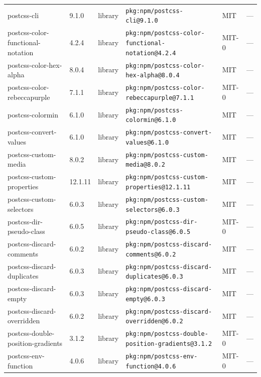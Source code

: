 \documentclass[11pt,a4paper]{article}
\begin{document}
\begin{longtable}{|p{4cm}|p{2cm}|p{1.6cm}|p{5cm}|p{1.5cm}|p{3.5cm}|}
\raggedright postcss-cli & 9.1.0 & library & \small\texttt{pkg:npm/postcss-cli@9.1.0} & MIT & \small — \\
\raggedright postcss-color-functional-notation & 4.2.4 & library & \small\texttt{pkg:npm/postcss-color-functional-notation@4.2.4} & MIT-0 & \small — \\
\raggedright postcss-color-hex-alpha & 8.0.4 & library & \small\texttt{pkg:npm/postcss-color-hex-alpha@8.0.4} & MIT & \small — \\
\raggedright postcss-color-rebeccapurple & 7.1.1 & library & \small\texttt{pkg:npm/postcss-color-rebeccapurple@7.1.1} & MIT-0 & \small — \\
\raggedright postcss-colormin & 6.1.0 & library & \small\texttt{pkg:npm/postcss-colormin@6.1.0} & MIT & \small — \\
\raggedright postcss-convert-values & 6.1.0 & library & \small\texttt{pkg:npm/postcss-convert-values@6.1.0} & MIT & \small — \\
\raggedright postcss-custom-media & 8.0.2 & library & \small\texttt{pkg:npm/postcss-custom-media@8.0.2} & MIT & \small — \\
\raggedright postcss-custom-properties & 12.1.11 & library & \small\texttt{pkg:npm/postcss-custom-properties@12.1.11} & MIT & \small — \\
\raggedright postcss-custom-selectors & 6.0.3 & library & \small\texttt{pkg:npm/postcss-custom-selectors@6.0.3} & MIT & \small — \\
\raggedright postcss-dir-pseudo-class & 6.0.5 & library & \small\texttt{pkg:npm/postcss-dir-pseudo-class@6.0.5} & MIT-0 & \small — \\
\raggedright postcss-discard-comments & 6.0.2 & library & \small\texttt{pkg:npm/postcss-discard-comments@6.0.2} & MIT & \small — \\
\raggedright postcss-discard-duplicates & 6.0.3 & library & \small\texttt{pkg:npm/postcss-discard-duplicates@6.0.3} & MIT & \small — \\
\raggedright postcss-discard-empty & 6.0.3 & library & \small\texttt{pkg:npm/postcss-discard-empty@6.0.3} & MIT & \small — \\
\raggedright postcss-discard-overridden & 6.0.2 & library & \small\texttt{pkg:npm/postcss-discard-overridden@6.0.2} & MIT & \small — \\
\raggedright postcss-double-position-gradients & 3.1.2 & library & \small\texttt{pkg:npm/postcss-double-position-gradients@3.1.2} & MIT-0 & \small — \\
\raggedright postcss-env-function & 4.0.6 & library & \small\texttt{pkg:npm/postcss-env-function@4.0.6} & MIT-0 & \small — \\

\end{longtable}
\end{document}
